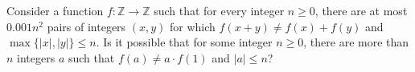 Consider a function $f: \mathbb Z \to \mathbb Z$ such that for every integer $n \ge 0$, there are at most $0.001n^2$ pairs of integers $(x,y)$ for which $f(x+y) \neq f(x)+f(y)$ and $\max\{ \lvert x \rvert, \lvert y \rvert \} \le n$.  Is it possible that for some integer $n \ge 0$, there are more than $n$ integers $a$ such that $f(a) \neq a \cdot f(1)$ and $\lvert a \rvert \le n$?